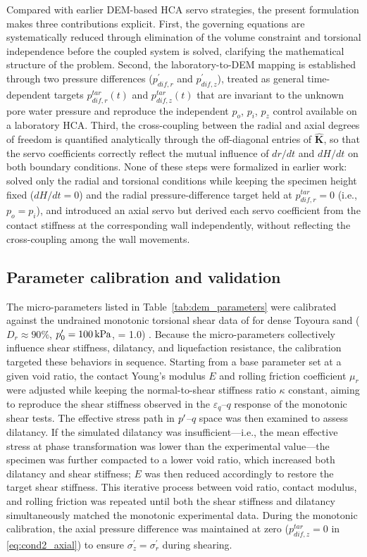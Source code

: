 Compared with earlier DEM-based HCA servo strategies, the present formulation makes three contributions explicit. First, the governing equations are systematically reduced through elimination of the volume constraint and torsional independence before the coupled system is solved, clarifying the mathematical structure of the problem. Second, the laboratory-to-DEM mapping is established through two pressure differences ($p_{dif,r}^{\prime}$ and $p_{dif,z}^{\prime}$), treated as general time-dependent targets $p_{dif,r}^{tar}(t)$ and $p_{dif,z}^{tar}(t)$ that are invariant to the unknown pore water pressure and reproduce the independent $p_o$, $p_i$, $p_z$ control available on a laboratory HCA. Third, the cross-coupling between the radial and axial degrees of freedom is quantified analytically through the off-diagonal entries of $\hat{\mathbf{K}}$, so that the servo coefficients correctly reflect the mutual influence of $dr/dt$ and $dH/dt$ on both boundary conditions. None of these steps were formalized in earlier work: \citet{Han2024jgs} solved only the radial and torsional conditions while keeping the specimen height fixed ($dH/dt=0$) and the radial pressure-difference target held at $p_{dif,r}^{tar}=0$ (i.e., $p_o=p_i$), and \citet{Ma2024} introduced an axial servo but derived each servo coefficient from the contact stiffness at the corresponding wall independently, without reflecting the cross-coupling among the wall movements.

\subsection{Parameter calibration and validation}
\label{subsec:calibration_validation}

The micro-parameters listed in Table~\ref{tab:dem_parameters} were calibrated against the undrained monotonic torsional shear data of \citet{Nakata1998} for dense Toyoura sand ($D_r \approx 90\%$, $p^\prime_0=\SI{100}{kPa}$, \Kzero{} = 1.0) \citep[see also][]{Ma2024}. Because the micro-parameters collectively influence shear stiffness, dilatancy, and liquefaction resistance, the calibration targeted these behaviors in sequence. Starting from a base parameter set at a given void ratio, the contact Young's modulus $E$ and rolling friction coefficient $\mu_r$ were adjusted while keeping the normal-to-shear stiffness ratio $\kappa$ constant, aiming to reproduce the shear stiffness observed in the $\varepsilon_q$--$q$ response of the monotonic shear tests. The effective stress path in $p^\prime$--$q$ space was then examined to assess dilatancy. If the simulated dilatancy was insufficient---i.e., the mean effective stress at phase transformation was lower than the experimental value---the specimen was further compacted to a lower void ratio, which increased both dilatancy and shear stiffness; $E$ was then reduced accordingly to restore the target shear stiffness. This iterative process between void ratio, contact modulus, and rolling friction was repeated until both the shear stiffness and dilatancy simultaneously matched the monotonic experimental data. During the monotonic calibration, the axial pressure difference was maintained at zero ($p_{dif,z}^{tar}=0$ in \cref{eq:cond2_axial}) to ensure $\sigma_z^{\prime}=\sigma_r^{\prime}$ during shearing.

